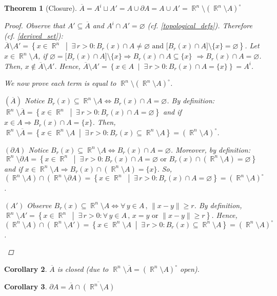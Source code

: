 \documentclass[12pt]{article}
\let\emptyset\varnothing
\let\RA\Rightarrow
\let\LR\Leftrightarrow
\newcommand{\set}[2]{\left\{{#1}\;\middle|\;{#2}\right\}}
\newcommand{\Forall}[1]{\forall\,{#1}\,,\,}
\newcommand{\Exist}[1]{\exists\,{#1}:}
\DeclareMathOperator{\R}{\mathbb{R}}
\newcommand{\comp}[2][n]{\R^{#1}\setminus{#2}}
\newcommand{\cl}[1]{\overline{#1}}
\newtheorem{theorem}{Theorem}[subsection]
\newtheorem{corollary}[theorem]{Corollary}
\begin{document}
\begin{theorem}[Closure]
  \label{closure}
  $\cl{A}=A^i\sqcup A'=A\cup \partial A=A\cup A'=\comp{(\comp{A})^\circ}$
  \begin{proof}
    Observe that $A'\subseteq \cl{A}$ and $A^i\cap A'=\emptyset$ (cf. \ref{topological_defs}). Therefore (cf. \ref{derived_set}): $\cl{A}\setminus A'=\set{x\in\R^n}{\Exist{r>0}B_r(x)\cap A\neq \emptyset\text{ and }\big[B_r(x)\cap A\big]\setminus\{x\}=\emptyset}$. Let $x\in\comp{A}$, if $\emptyset=\big[B_r(x)\cap A\big]\setminus\{x\}\RA B_r(x)\cap A\subseteq\{x\}$ $\RA B_r(x)\cap A=\emptyset$. Then, $x\notin\cl{A}\setminus A'$. Hence, $\cl{A}\setminus A'=\set{x\in A}{\Exist{r>0}B_r(x)\cap A=\{x\}}=A^i$.

    \noindent We now prove each term is equal to $\comp{(\comp{A})^\circ}$.
    \begin{compactitem}
      \item[$(\cl{A})$] Notice $B_r(x)\subseteq \comp{A}\LR B_r(x)\cap A=\emptyset$. By definition: $\comp{\cl{A}}=\set{x\in \R^n}{\Exist{r>0}B_r(x)\cap A= \emptyset}$ and if $x\in A\RA B_r(x)\cap A=\{x\}$. Then, $\comp{\cl{A}}=\set{x\in \comp{A}}{\Exist{r>0}B_r(x)\subseteq \comp{A}}=(\comp{A})^\circ$.
      \item[$(\partial A)$] Notice $B_r(x)\subseteq \comp{A}\LR B_r(x)\cap A=\emptyset$. Moreover, by definition: $\comp{\partial A}=\set{x\in \R^n}{\Exist{r>0}B_r(x)\cap A= \emptyset\text{ or }B_r(x)\cap (\comp{A})=\emptyset}$ and if $x\in\comp{A}\RA B_r(x)\cap (\comp{A})=\{x\}$. So, $(\comp{A})\cap(\comp{\partial A})=\set{x\in \R^n}{\Exist{r>0}B_r(x)\cap A=\emptyset}=(\comp{A})^\circ$.
      \item[$(A')$] Observe $B_r(x)\subseteq \comp{A}\LR \Forall{y\in A}\|x-y\|\geq r$. By definition, $\comp{A'}=\set{x\in \R^n}{\Exist{r>0}\Forall{y\in A}x=y\text{ or }\|x-y\|\geq r}$. Hence, $(\comp{A})\cap(\comp{A'})=\set{x\in \comp{A}}{\Exist{r>0}B_r(x)\subseteq \comp{A}}=(\comp{A})^\circ$.
    \end{compactitem}
  \end{proof}
\end{theorem}

\begin{corollary}
  $\cl{A}$ is closed (due to $\comp{\cl{A}}=(\comp{A})^\circ$ open).
\end{corollary}

\begin{corollary}
  $\partial A=\cl{A}\cap\cl{(\comp{A})}$
\end{corollary}
\end{document}
